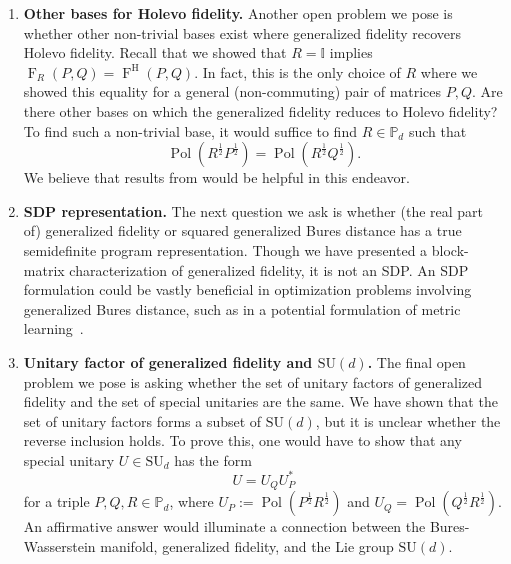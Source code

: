 \documentclass[12pt]{article}
\theoremstyle{definition}
\begin{document}
\begin{enumerate}
\begin{equation}
        \operatorname{F}^\mathrm M(P,Q) \leq \operatorname{F}^\mathrm H(P,Q) \leq \operatorname{F}^\mathrm U(P,Q), 
    \end{equation}
    for any $P,Q \geq 0$. Moreover, it is also known $\operatorname{F}^\mathrm M$ is the smallest and $\operatorname{F}^\mathrm{U}$ is the largest quantization of classical fidelity that satisfies DPI~\cite{matsumoto2010reverse}. Thus, the family of $x$-Polar fidelities (in the range $x \in [-1,1]$) might be helpful in studying fidelities that satisfy the data processing inequality. 
    \item \textbf{Other bases for Holevo fidelity.} 
Another open problem we pose is whether other non-trivial bases exist where generalized fidelity recovers Holevo fidelity. Recall that we showed that $R = \mathbb I$ implies $\operatorname{F}_R(P,Q) = \operatorname{F}^\mathrm H(P,Q)$. In fact, this is the only choice of $R$ where we showed this equality for a general (non-commuting) pair of matrices $P,Q$. Are there other bases on which the generalized fidelity reduces to Holevo fidelity? To find such a non-trivial base, it would suffice to find $R \in \mathbb P_d$ such that
\begin{equation}
    \operatorname{Pol}\left(R ^{\frac12} P ^{\frac12} \right) = \operatorname{Pol}\left(R ^{\frac12} Q ^{\frac12} \right). 
\end{equation}
We believe that results from \cite{lawson2008gamma} would be helpful in this endeavor.
\item \textbf{SDP representation.} The next question we ask is whether (the real part of) generalized fidelity or squared generalized Bures distance has a true semidefinite program representation. Though we have presented a block-matrix characterization of generalized fidelity, it is not an SDP. An SDP formulation could be vastly beneficial in optimization problems involving generalized Bures distance, such as in a potential formulation of metric learning~\cite{yang2006distance, zadeh2016geometric}. 
\item \textbf{Unitary factor of generalized fidelity and $\mathrm{SU}(d)$.} The final open problem we pose is asking whether the set of unitary factors of generalized fidelity and the set of special unitaries are the same. We have shown that the set of unitary factors forms a subset of $\mathrm{SU}(d)$, but it is unclear whether the reverse inclusion holds. To prove this, one would have to show that any special unitary $U \in \mathrm{SU}_d$ has the form
\begin{equation}
    U = U_Q U_P^*
\end{equation}
for a triple $P,Q,R \in \mathbb P_d$, where $U_P := \operatorname{Pol}\left(P ^{\frac12} R ^{\frac12} \right)$ and $U_Q = \operatorname{Pol}\left(Q ^{\frac12} R ^{\frac12} \right)$.
An affirmative answer would illuminate a connection between the Bures-Wasserstein manifold, generalized fidelity, and the Lie group $\mathrm{SU}(d)$. 
\end{enumerate}
\end{document}
